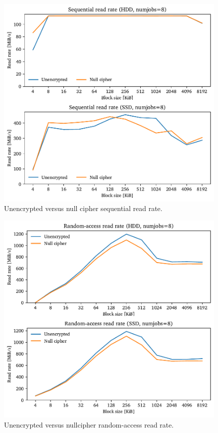 \begin{figure}[htb!]
	\center
	\includegraphics[scale=1]{../fig/performance.hwexperiments.nullcipherseq.pdf}
	\caption[
		Unencrypted versus null cipher sequential read rate
	]{
		Unencrypted versus null cipher sequential read rate. 
	}
	\label{fig:performance.hwexperiments.nullcipherseq}
\end{figure}

\begin{figure}[htb!]
	\center
	\includegraphics[scale=1]{../fig/performance.hwexperiments.nullcipherrand.pdf}
	\caption[
		Unencrypted versus null cipher random-access read rate
	]{
		Unencrypted versus nullcipher random-access read rate. 
	}
	\label{fig:performance.hwexperiments.nullcipherrand}
\end{figure}

